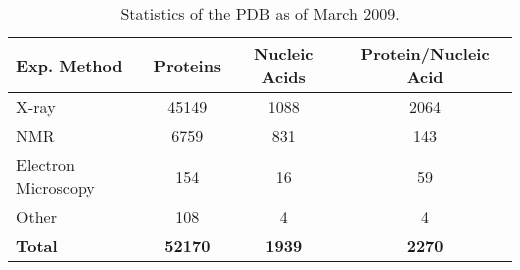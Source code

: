 \begin{table}[tb]
\center
\begin{tabular}{lccc}
\toprule                %
\textbf{Exp. Method} & \textbf{Proteins} & \textbf{Nucleic Acids} & \textbf{Protein/Nucleic Acid} \\
\midrule                %
	X-ray		         &45149	&1088	&2064\\
	NMR 		         &6759	&831	&143\\
	Electron Microscopy &154		&16		&59\\
	Other			&108	&4		&4\\
	\textbf{Total} & \textbf{52170}	&\textbf{1939}	&\textbf{2270}\\
\bottomrule                %
\end{tabular}
\caption[Statistics of the PDB as of March 2009]{Statistics of the PDB as of March 2009.}
\label{tab:pdb_current_holding_breakdown}
\end{table}


